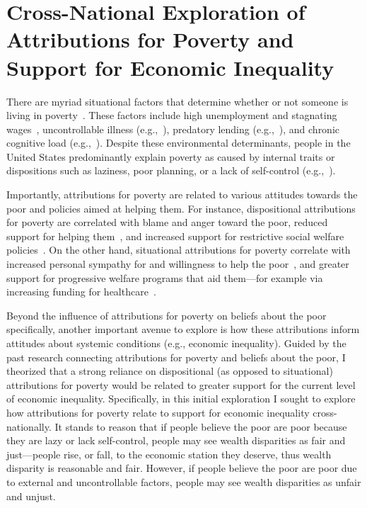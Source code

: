 \documentclass{sfuthesis}
\begin{document}
\chapter{Cross-National Exploration of Attributions for Poverty and Support for Economic Inequality}

There are myriad situational factors that determine whether or not someone is living in poverty~\cite{piff18}. These factors include high unemployment and stagnating wages~\cite{desilver14}, uncontrollable illness (e.g.,~\cite{grau88}), predatory lending (e.g.,~\cite{engel02}), and chronic cognitive load (e.g.,~\cite{mani13}). Despite these environmental determinants, people in the United States predominantly explain poverty as caused by internal traits or dispositions such as laziness, poor planning, or a lack of self-control (e.g.,~\cite{cozzarelli01, feagin75, feather74, halpern93}).

Importantly, attributions for poverty are related to various attitudes towards the poor and policies aimed at helping them. For instance, dispositional attributions for poverty are correlated with blame and anger toward the poor, reduced support for helping them~\cite{cozzarelli01, zucker93}, and increased support for restrictive social welfare policies~\cite{bullock03}. On the other hand, situational attributions for poverty correlate with increased personal sympathy for and willingness to help the poor~\cite{osborne15, zucker93}, and greater support for progressive welfare programs that aid them––for example via increasing funding for healthcare~\cite{bullock03, kluegel86}.

Beyond the influence of attributions for poverty on beliefs about the poor specifically, another important avenue to explore is how these attributions inform attitudes about systemic conditions (e.g., economic inequality). Guided by the past research connecting attributions for poverty and beliefs about the poor, I theorized that a strong reliance on dispositional (as opposed to situational) attributions for poverty would be related to greater support for the current level of economic inequality. Specifically, in this initial exploration I sought to explore how attributions for poverty relate to support for economic inequality cross-nationally. It stands to reason that if people believe the poor are poor because they are lazy or lack self-control, people may see wealth disparities as fair and just—people rise, or fall, to the economic station they deserve, thus wealth disparity is reasonable and fair. However, if people believe the poor are poor due to external and uncontrollable factors, people may see wealth disparities as unfair and unjust.
\end{document}
